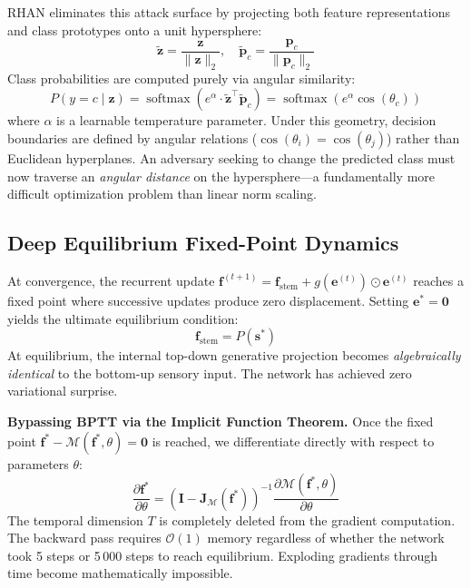 \documentclass[12pt,a4paper]{article}
\begin{document}
RHAN eliminates this attack surface by projecting both feature
representations and class prototypes onto a unit hypersphere:
\begin{equation}
  \tilde{\mathbf{z}} = \frac{\mathbf{z}}{\|\mathbf{z}\|_2}, \quad
  \tilde{\mathbf{p}}_c = \frac{\mathbf{p}_c}{\|\mathbf{p}_c\|_2}
\end{equation}
Class probabilities are computed purely via angular similarity:
\begin{equation}
  P(y = c \mid \mathbf{z}) = \operatorname{softmax}\left(
  e^{\alpha} \cdot \tilde{\mathbf{z}}^\top \tilde{\mathbf{p}}_c \right)
  = \operatorname{softmax}\left( e^{\alpha} \cos(\theta_c) \right)
\end{equation}
where $\alpha$ is a learnable temperature parameter. Under this geometry,
decision boundaries are defined by angular relations
($\cos(\theta_i) = \cos(\theta_j)$) rather than Euclidean hyperplanes.
An adversary seeking to change the predicted class must now traverse an
\textit{angular distance} on the hypersphere---a fundamentally more difficult
optimization problem than linear norm scaling.

\subsection{Deep Equilibrium Fixed-Point Dynamics}
\label{sec:deq}

At convergence, the recurrent update
$\mathbf{f}^{(t+1)} = \mathbf{f}_{\mathrm{stem}} + g(\mathbf{e}^{(t)}) \odot \mathbf{e}^{(t)}$
reaches a fixed point where successive updates produce zero displacement.
Setting $\mathbf{e}^* = \mathbf{0}$ yields the ultimate equilibrium condition:
\begin{equation}
  \mathbf{f}_{\mathrm{stem}} = P(\mathbf{s}^*)
  \label{eq:equilibrium}
\end{equation}
At equilibrium, the internal top-down generative projection becomes
\textit{algebraically identical} to the bottom-up sensory input. The network
has achieved zero variational surprise.

\textbf{Bypassing BPTT via the Implicit Function Theorem.}
Once the fixed point $\mathbf{f}^* - \mathcal{M}(\mathbf{f}^*, \theta) = \mathbf{0}$
is reached, we differentiate directly with respect to parameters $\theta$:
\begin{equation}
  \frac{\partial \mathbf{f}^*}{\partial \theta} =
  \left( \mathbf{I} - \mathbf{J}_{\mathcal{M}}(\mathbf{f}^*) \right)^{-1}
  \frac{\partial \mathcal{M}(\mathbf{f}^*, \theta)}{\partial \theta}
  \label{eq:implicit}
\end{equation}
The temporal dimension $T$ is completely deleted from the gradient computation.
The backward pass requires $\mathcal{O}(1)$ memory regardless of whether the
network took 5 steps or 5\,000 steps to reach equilibrium. Exploding gradients
through time become mathematically impossible.
\end{document}
